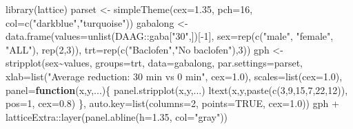 \documentclass[
  10pt,
  b5paper]{book}
\newenvironment{Shaded}{\begin{snugshade}}{\end{snugshade}}
\newcommand{\AttributeTok}[1]{\textcolor[rgb]{0.77,0.63,0.00}{#1}}
\newcommand{\ConstantTok}[1]{\textcolor[rgb]{0.00,0.00,0.00}{#1}}
\newcommand{\ControlFlowTok}[1]{\textcolor[rgb]{0.13,0.29,0.53}{\textbf{#1}}}
\newcommand{\DecValTok}[1]{\textcolor[rgb]{0.00,0.00,0.81}{#1}}
\newcommand{\FloatTok}[1]{\textcolor[rgb]{0.00,0.00,0.81}{#1}}
\newcommand{\FunctionTok}[1]{\textcolor[rgb]{0.00,0.00,0.00}{#1}}
\newcommand{\NormalTok}[1]{#1}
\newcommand{\OtherTok}[1]{\textcolor[rgb]{0.56,0.35,0.01}{#1}}
\newcommand{\SpecialCharTok}[1]{\textcolor[rgb]{0.00,0.00,0.00}{#1}}
\newcommand{\StringTok}[1]{\textcolor[rgb]{0.31,0.60,0.02}{#1}}
\begin{document}
\begin{Shaded}
\begin{Highlighting}[]
\FunctionTok{library}\NormalTok{(lattice)}
\NormalTok{parset }\OtherTok{\textless{}{-}} \FunctionTok{simpleTheme}\NormalTok{(}\AttributeTok{cex=}\FloatTok{1.35}\NormalTok{, }\AttributeTok{pch=}\DecValTok{16}\NormalTok{,}
                      \AttributeTok{col=}\FunctionTok{c}\NormalTok{(}\StringTok{"darkblue"}\NormalTok{,}\StringTok{"turquoise"}\NormalTok{))}
\NormalTok{gabalong }\OtherTok{\textless{}{-}} \FunctionTok{data.frame}\NormalTok{(}\AttributeTok{values=}\FunctionTok{unlist}\NormalTok{(DAAG}\SpecialCharTok{::}\NormalTok{gaba[}\StringTok{"30"}\NormalTok{,])[}\SpecialCharTok{{-}}\DecValTok{1}\NormalTok{],}
                       \AttributeTok{sex=}\FunctionTok{rep}\NormalTok{(}\FunctionTok{c}\NormalTok{(}\StringTok{"male"}\NormalTok{, }\StringTok{"female"}\NormalTok{, }\StringTok{"ALL"}\NormalTok{), }\FunctionTok{rep}\NormalTok{(}\DecValTok{2}\NormalTok{,}\DecValTok{3}\NormalTok{)),}
                       \AttributeTok{trt=}\FunctionTok{rep}\NormalTok{(}\FunctionTok{c}\NormalTok{(}\StringTok{"Baclofen"}\NormalTok{,}\StringTok{"No baclofen"}\NormalTok{),}\DecValTok{3}\NormalTok{))}
\NormalTok{gph }\OtherTok{\textless{}{-}} \FunctionTok{stripplot}\NormalTok{(sex}\SpecialCharTok{\textasciitilde{}}\NormalTok{values, }\AttributeTok{groups=}\NormalTok{trt, }\AttributeTok{data=}\NormalTok{gabalong, }
          \AttributeTok{par.settings=}\NormalTok{parset,}
          \AttributeTok{xlab=}\FunctionTok{list}\NormalTok{(}\StringTok{"Average reduction: 30 min vs 0 min"}\NormalTok{,}
          \AttributeTok{cex=}\FloatTok{1.0}\NormalTok{),}
          \AttributeTok{scales=}\FunctionTok{list}\NormalTok{(}\AttributeTok{cex=}\FloatTok{1.0}\NormalTok{),}
          \AttributeTok{panel=}\ControlFlowTok{function}\NormalTok{(x,y,...)\{}
              \FunctionTok{panel.stripplot}\NormalTok{(x,y,...)}
              \FunctionTok{ltext}\NormalTok{(x,y,}\FunctionTok{paste}\NormalTok{(}\FunctionTok{c}\NormalTok{(}\DecValTok{3}\NormalTok{,}\DecValTok{9}\NormalTok{,}\DecValTok{15}\NormalTok{,}\DecValTok{7}\NormalTok{,}\DecValTok{22}\NormalTok{,}\DecValTok{12}\NormalTok{)), }\AttributeTok{pos=}\DecValTok{1}\NormalTok{,}
                    \AttributeTok{cex=}\FloatTok{0.8}\NormalTok{)}
\NormalTok{          \}, }\AttributeTok{auto.key=}\FunctionTok{list}\NormalTok{(}\AttributeTok{columns=}\DecValTok{2}\NormalTok{, }\AttributeTok{points=}\ConstantTok{TRUE}\NormalTok{, }\AttributeTok{cex=}\FloatTok{1.0}\NormalTok{))}
\NormalTok{gph }\SpecialCharTok{+}\NormalTok{ latticeExtra}\SpecialCharTok{::}\FunctionTok{layer}\NormalTok{(}\FunctionTok{panel.abline}\NormalTok{(}\AttributeTok{h=}\FloatTok{1.35}\NormalTok{, }\AttributeTok{col=}\StringTok{"gray"}\NormalTok{))}
\end{Highlighting}
\end{Shaded}
\end{document}
